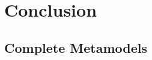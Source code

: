 \documentclass[12pt,letterpaper]{report}
\begin{document}
	\chapter{Conclusion} \label{ch:5}
	
	
	\renewcommand\bibname{References}
	\printbibliography[heading=bibintoc]
	
	\begin{appendices}
		
		\chapter{Complete Metamodels} \label{ch:A}
		
		
	\end{appendices}
	
\end{document}
